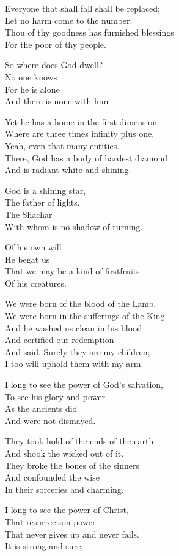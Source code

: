 \documentclass[
]{book}
\begin{document}
Everyone that shall fall shall be replaced;\\
Let no harm come to the number.\\
Thou of thy goodness has furnished blessings\\
For the poor of thy people.

So where does God dwell?\\
No one knows\\
For he is alone\\
And there is none with him

Yet he has a home in the first dimension\\
Where are three times infinity plus one,\\
Yeah, even that many entities.\\
There, God has a body of hardest diamond\\
And is radiant white and shining.

God is a shining star,\\
The father of lights,\\
The Shachar\\
With whom is no shadow of turning.

Of his own will\\
He begat us\\
That we may be a kind of firstfruits\\
Of his creatures.

We were born of the blood of the Lamb.\\
We were born in the sufferings of the King\\
And he washed us clean in his blood\\
And certified our redemption\\
And said, Surely they are my children;\\
I too will uphold them with my arm.

I long to see the power of God's salvation,\\
To see his glory and power\\
As the ancients did\\
And were not dismayed.

They took hold of the ends of the earth\\
And shook the wicked out of it.\\
They broke the bones of the sinners\\
And confounded the wise\\
In their sorceries and charming.

I long to see the power of Christ,\\
That resurrection power\\
That never gives up and never fails.\\
It is strong and sure,
\end{document}
